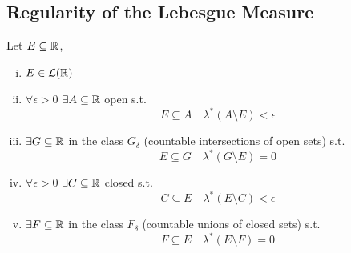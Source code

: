 \subsection{Regularity of the Lebesgue Measure}
Let $E\subseteq\mathbb{R}$, \tfae
\begin{enumerate}[i)]
    \item\label{LebReg:1} $E\in\mathcal{L}(\mathbb{R})$
    \item\label{LebReg:2} $\forall \epsilon >0$ $\exists A \subseteq \mathbb{R}$ open s.t.
        \[
           E\subseteq A \quad \lambda^*(A\setminus E) < \epsilon 
        \]
    \item\label{LebReg:3} $\exists G \subseteq \mathbb{R}$ in the class $G_{\delta}$ (countable intersections of open sets) s.t.
        \[
            E\subseteq G \quad \lambda^*(G\setminus E)=0  
        \]
    \item\label{LebReg:4} $\forall \epsilon >0$ $\exists C \subseteq \mathbb{R}$ closed s.t.
    \[
       C\subseteq E \quad \lambda^*(E\setminus C) < \epsilon 
    \]
    \item\label{LebReg:5} $\exists F \subseteq \mathbb{R}$ in the class $F_{\delta}$ (countable unions of closed sets) s.t.
        \[
            F\subseteq E \quad \lambda^*(E\setminus F)=0  
        \]
\end{enumerate}
